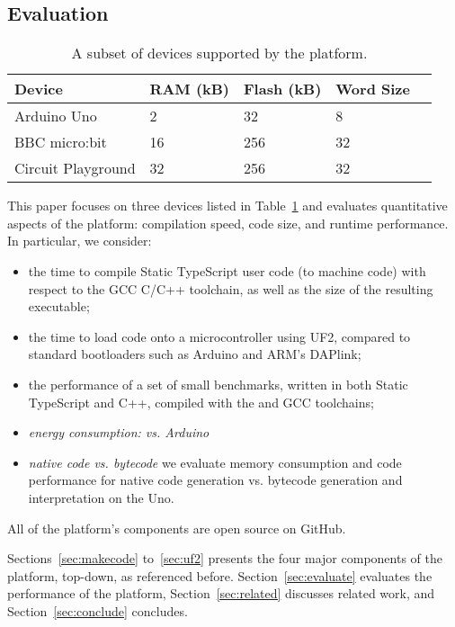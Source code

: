       
      

\subsection{Evaluation}

\begin{table}[]
\centering
\begin{tabular}{|l|l|l|l|l|}
\hline
Device             & RAM (kB) & Flash (kB) & Word Size        \\ \hline
Arduino Uno        & 2        & 32         & 8               \\ \hline
BBC micro:bit      & 16       & 256        & 32              \\ \hline
Circuit Playground & 32       & 256        & 32              \\ \hline
\end{tabular}
\caption{\label{table:devices}A subset of devices supported by the platform.}
\end{table}
This paper focuses on three devices listed in Table~\ref{table:devices}
and evaluates quantitative aspects of the platform:
compilation speed, code size, and runtime performance.  In particular, we
consider:
\begin{itemize}
\item the time to compile Static TypeScript user code (to machine code) with respect
      to the GCC C/C++ toolchain, as well as the size of the resulting executable;
\item the time to load code onto a microcontroller using UF2, compared to standard bootloaders
      such as Arduino and ARM's DAPlink;
\item the performance of a set of small benchmarks, written in both Static TypeScript and C++,
      compiled with the \MC and GCC toolchains;
\item \emph{energy consumption: \CO vs. Arduino}
\item \emph{native code vs. bytecode} we
      evaluate memory consumption and code performance for native code generation
      vs. bytecode generation and interpretation on the Uno.
\end{itemize}


All of the platform's components are open source on GitHub.
  
Sections~\ref{sec:makecode} to~\ref{sec:uf2} presents the four major components of the platform, top-down,
as referenced before. Section~\ref{sec:evaluate} evaluates the performance of the platform,
Section~\ref{sec:related} discusses related work, and Section~\ref{sec:conclude}
concludes.
